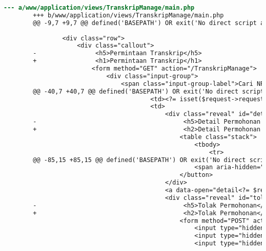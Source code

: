 \begin{itemize}
\begin{lstlisting}[frame=single, label={lst:perbaikan_1.3.1_tag_heading}, language=diff, caption=Perbaikan Kriteria Sukses 1.3.1 - Penggunaan \textit{Heading} Tidak Tepat]
        --- a/www/application/views/TranskripManage/main.php
        +++ b/www/application/views/TranskripManage/main.php
        @@ -9,7 +9,7 @@ defined('BASEPATH') OR exit('No direct script access allowed');
        
                <div class="row">
                    <div class="callout">
        -                <h5>Permintaan Transkrip</h5>
        +                <h1>Permintaan Transkrip</h1>
                        <form method="GET" action="/TranskripManage">
                            <div class="input-group">
                                <span class="input-group-label">Cari NPM:</span>
        @@ -40,7 +40,7 @@ defined('BASEPATH') OR exit('No direct script access allowed');
                                        <td><?= isset($request->requestByNPM) ? $request->requestByNPM : '-' ?></td>
                                        <td>
                                            <div class="reveal" id="detail<?= $request->id ?>" data-reveal>
        -                                        <h5>Detail Permohonan #<?= $request->id ?></h5>
        +                                        <h2>Detail Permohonan #<?= $request->id ?></h2>
                                                <table class="stack">
                                                    <tbody>
                                                        <tr>                                                     
        @@ -85,15 +85,15 @@ defined('BASEPATH') OR exit('No direct script access allowed');
                                                    <span aria-hidden="true">&times;</span>
                                                </button>                                        
                                            </div>
                                            <a data-open="detail<?= $request->id ?>"><i class="fi-eye"></i></a>
                                            <div class="reveal" id="tolak<?= $request->id ?>" data-reveal>
        -                                        <h5>Tolak Permohonan</h5>
        +                                        <h2>Tolak Permohonan</h2>
                                                <form method="POST" action="/TranskripManage/answer">
                                                    <input type="hidden" name="<?= $this->security->get_csrf_token_name() ?>" value="<?= $this->security->get_csrf_hash() ?>" />
                                                    <input type="hidden" name="id" value="<?= $request->id ?>"/>
                                                    <input type="hidden" name="answer" value="rejected"/>

\end{lstlisting}
\end{itemize}
